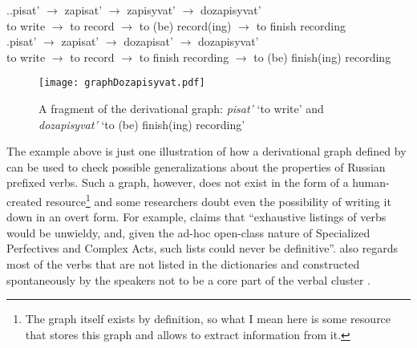 \ex.\label{deriv:dozapisyvat}\ag.\label{deriv:dozapisyvat1}pisat'\textsuperscript{\IPF} $\rightarrow$ zapisat'\textsuperscript{\PF} $\rightarrow$ zapisyvat'\textsuperscript{\IPF} $\rightarrow$ dozapisyvat'\textsuperscript{\PF}\\
{to write} $\rightarrow$ {to record} $\rightarrow$ {to (be) record(ing)} $\rightarrow$ {to finish recording}\\
\bg.\label{deriv:dozapisyvat2}pisat'\textsuperscript{\IPF} $\rightarrow$ zapisat'\textsuperscript{\PF} $\rightarrow$ dozapisat'\textsuperscript{\PF} $\rightarrow$ dozapisyvat'\textsuperscript{\IPF}\\
{to write} $\rightarrow$ {to record} $\rightarrow$ {to finish recording} $\rightarrow$ {to (be) finish(ing) recording}\\				

\begin{figure}
\begin{center}
\texttt{[image: graphDozapisyvat.pdf]}
\caption{A fragment of the derivational graph: \textit{pisat'} `to write' and \textit{dozapisyvat'} `to (be) finish(ing) recording'\label{tree:dozapisyvat}}
\end{center}
\end{figure}			

The example above is just one illustration of how a derivational graph defined by  can be used to check possible generalizations about the properties of Russian prefixed verbs. Such a graph, however, does not exist in the form of a human-created resource\footnote{The graph itself exists by definition, so what I mean here is some resource that stores this graph and allows to extract information from it.} and some researchers doubt even the possibility of writing it down in an overt form. For example, \citet[625]{Janda:07a} claims that ``exhaustive listings of verbs would be unwieldy, and, given the ad-hoc open-class nature of Specialized Perfectives and Complex Acts, such lists could never be definitive''. \citet[626]{Janda:07a} also regards most of the verbs that are not listed in the dictionaries and constructed spontaneously by the speakers not to be a core part of the verbal cluster  .

